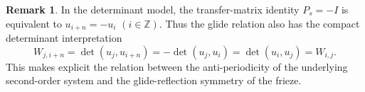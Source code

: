 \documentclass[amstex,11pt,reqno]{amsart}
\theoremstyle{definition}
\newtheorem{remark}[theorem]{Remark}
\newcommand{\Z}{\mathbb Z}
\begin{document}
\begin{remark}
\label{rem:vector-antiperiodic}
In the determinant model, the transfer-matrix identity $P_s=-I$ 
is equivalent to
$u_{i+n}=-u_i$ $(i\in\Z)$.
Thus the glide relation also has the compact determinant interpretation
\[
 W_{j,i+n}=\det(u_j,u_{i+n})
 =-\det(u_j,u_i)
 =\det(u_i,u_j)=W_{i,j}.
\]
This makes explicit the relation between the anti-periodicity of the underlying second-order system and the glide-reflection symmetry of the frieze.
\end{remark}

\end{document}

